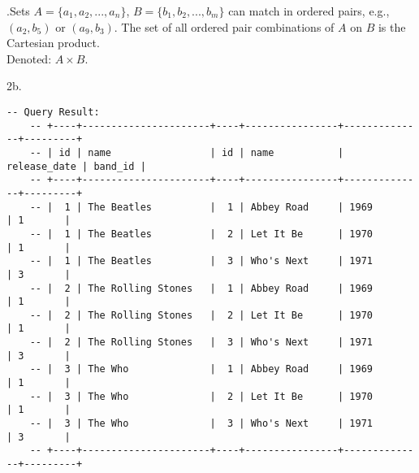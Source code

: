 \begin{Def}
    .Sets $A=\{a_1,a_2,...,a_n\}$, $B=\{b_1,b_2,...,b_m\}$ can match in ordered pairs, e.g.,\\
    $(a_2,b_5)$ or $(a_9, b_3)$. The set of all ordered pair combinations of $A$ on $B$ is the Cartesian product.\\

    \noindent
    Denoted: $A\times B$.
\end{Def}
2b.
\begin{lstlisting}[style=sql]
    -- Query Result:
    -- +----+----------------------+----+----------------+--------------+---------+
    -- | id | name                 | id | name           | release_date | band_id |
    -- +----+----------------------+----+----------------+--------------+---------+
    -- |  1 | The Beatles          |  1 | Abbey Road     | 1969         | 1       |
    -- |  1 | The Beatles          |  2 | Let It Be      | 1970         | 1       |
    -- |  1 | The Beatles          |  3 | Who's Next     | 1971         | 3       |
    -- |  2 | The Rolling Stones   |  1 | Abbey Road     | 1969         | 1       |
    -- |  2 | The Rolling Stones   |  2 | Let It Be      | 1970         | 1       |
    -- |  2 | The Rolling Stones   |  3 | Who's Next     | 1971         | 3       |
    -- |  3 | The Who              |  1 | Abbey Road     | 1969         | 1       |
    -- |  3 | The Who              |  2 | Let It Be      | 1970         | 1       |
    -- |  3 | The Who              |  3 | Who's Next     | 1971         | 3       |
    -- +----+----------------------+----+----------------+--------------+---------+
\end{lstlisting}


